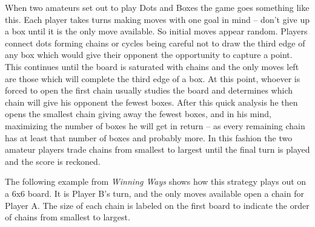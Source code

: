 \documentclass[12pt,twoside]{reedthesis}
\begin{document}
When two amateurs set out to play Dots and Boxes the game goes something like this.  Each player takes turns making moves with one goal in mind -- don't give up a box until it is the only move available.  So initial moves appear random.  Players connect dots forming chains or cycles being careful not to draw the third edge of any box which would give their opponent the opportunity to capture a point.  This continues until the board is saturated with chains and the only moves left are those which will complete the third edge of a box.  At this point, whoever is forced to open the first chain usually studies the board and determines which chain will give his opponent the fewest boxes.  After this quick analysis he then opens the smallest chain giving away the fewest boxes, and in his mind, maximizing the number of boxes he will get in return -- as every remaining chain has at least that number of boxes and probably more.  In this fashion the two amateur players trade chains from smallest to largest until the final turn is played and the score is reckoned.

The following example from \emph{Winning Ways} shows how this strategy plays out on a $6$x$6$ board.  It is Player B's turn, and the only moves available open a chain for Player A.  The size of each chain is labeled on the first board to indicate the order of chains from smallest to largest.
\end{document}
